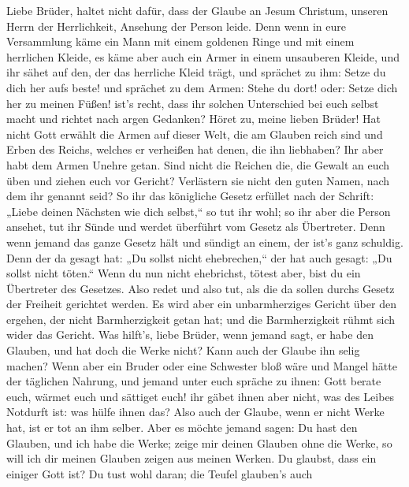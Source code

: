  Liebe Brüder, haltet nicht dafür, dass der Glaube an
Jesum Christum, unseren Herrn der Herrlichkeit, Ansehung der Person
leide.  Denn wenn in eure Versammlung käme ein Mann mit
einem goldenen Ringe und mit einem herrlichen Kleide, es käme aber auch
ein Armer in einem unsauberen Kleide,  und ihr sähet auf
den, der das herrliche Kleid trägt, und sprächet zu ihm: Setze du dich
her aufs beste! und sprächet zu dem Armen: Stehe du dort! oder: Setze
dich her zu meinen Füßen!  ist's recht, dass ihr solchen
Unterschied bei euch selbst macht und richtet nach argen Gedanken?
 Höret zu, meine lieben Brüder! Hat nicht Gott erwählt die
Armen auf dieser Welt, die am Glauben reich sind und Erben des Reichs,
welches er verheißen hat denen, die ihn liebhaben?  Ihr
aber habt dem Armen Unehre getan. Sind nicht die Reichen die, die Gewalt
an euch üben und ziehen euch vor Gericht?  Verlästern sie
nicht den guten Namen, nach dem ihr genannt seid?  So ihr
das königliche Gesetz erfüllet nach der Schrift: „Liebe deinen Nächsten
wie dich selbst,`` so tut ihr wohl;  so ihr aber die
Person ansehet, tut ihr Sünde und werdet überführt vom Gesetz als
Übertreter.  Denn wenn jemand das ganze Gesetz hält und
sündigt an einem, der ist's ganz schuldig.  Denn der da
gesagt hat: „Du sollst nicht ehebrechen,`` der hat auch gesagt: „Du
sollst nicht töten.`` Wenn du nun nicht ehebrichst, tötest aber, bist du
ein Übertreter des Gesetzes.  Also redet und also tut,
als die da sollen durchs Gesetz der Freiheit gerichtet werden.
 Es wird aber ein unbarmherziges Gericht über den
ergehen, der nicht Barmherzigkeit getan hat; und die Barmherzigkeit
rühmt sich wider das Gericht.  Was hilft's, liebe Brüder,
wenn jemand sagt, er habe den Glauben, und hat doch die Werke nicht?
Kann auch der Glaube ihn selig machen?  Wenn aber ein
Bruder oder eine Schwester bloß wäre und Mangel hätte der täglichen
Nahrung,  und jemand unter euch spräche zu ihnen: Gott
berate euch, wärmet euch und sättiget euch! ihr gäbet ihnen aber nicht,
was des Leibes Notdurft ist: was hülfe ihnen das?  Also
auch der Glaube, wenn er nicht Werke hat, ist er tot an ihm selber.
 Aber es möchte jemand sagen: Du hast den Glauben, und
ich habe die Werke; zeige mir deinen Glauben ohne die Werke, so will ich
dir meinen Glauben zeigen aus meinen Werken.  Du glaubst,
dass ein einiger Gott ist? Du tust wohl daran; die Teufel glauben's auch
